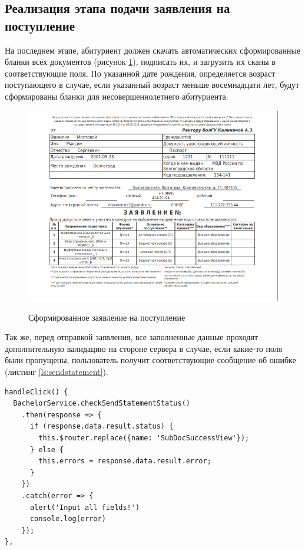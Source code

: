 \subsection{Реализация этапа подачи заявления на поступление}

На последнем этапе, абитуриент должен скачать автоматических сформированные бланки всех документов (рисунок \ref{fig:statement}), подписать их, и загрузить их сканы в соответствующие поля. По указанной дате рождения, определяется возраст поступающего в случае, если указанный возраст меньше восемнадцати лет, будут сформированы бланки для несовершеннолетнего абитуриента.

\begin{figure}[H]
\begin{center}
\includegraphics[width=0.9\hsize]{fig/statement.png}\\[2mm]
\caption{Сформированное заявление на поступление}\label{fig:statement}
\end{center}
\end{figure}

Так же, перед отправкой заявления, все заполненные данные проходят дополнительную валидацию на стороне сервера в случае, если какие-то поля были пропущены, пользователь получит соответствующие сообщение об ошибке (листинг \ref{ls:sendstatement}).

\begin{lstlisting}[caption={Валидация всех полей и отправка заявления}, label={ls:sendstatement}]
handleClick() {
  BachelorService.checkSendStatementStatus()
    .then(response => {
      if (response.data.result.status) {
        this.$router.replace({name: 'SubDocSuccessView'});
      } else {
        this.errors = response.data.result.error;
      }
    })
    .catch(error => {
      alert('Input all fields!')
      console.log(error)
    });
},
\end{lstlisting}

